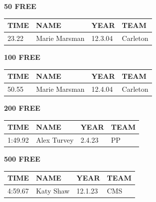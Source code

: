 \begin{table}[H]
\centering
\begin{minipage}[t]{0.48\textwidth}
\centering
\textbf{50 FREE}\\[0.1cm]
\begin{tabular}{@{}p{1.8cm}p{2.8cm}p{1.2cm}p{1.4cm}@{}}
\hline
    \textbf{TIME} & \textbf{NAME} & \textbf{YEAR} & \textbf{TEAM} \\
\hline
    23.22 & Marie Marsman & 12.3.04 & Carleton \\
\hline
\end{tabular}
\end{minipage}\hfill
\begin{minipage}[t]{0.48\textwidth}
\centering
\textbf{100 FREE}\\[0.1cm]
\begin{tabular}{@{}p{1.8cm}p{2.8cm}p{1.2cm}p{1.4cm}@{}}
\hline
    \textbf{TIME} & \textbf{NAME} & \textbf{YEAR} & \textbf{TEAM} \\
\hline
    50.55 & Marie Marsman & 12.4.04 & Carleton \\
\hline
\end{tabular}
\end{minipage}
\end{table}

\begin{table}[H]
\centering
\begin{minipage}[t]{0.48\textwidth}
\centering
\textbf{200 FREE}\\[0.1cm]
\begin{tabular}{@{}p{1.8cm}p{2.8cm}p{1.2cm}p{1.4cm}@{}}
\hline
    \textbf{TIME} & \textbf{NAME} & \textbf{YEAR} & \textbf{TEAM} \\
\hline
    1:49.92 & Alex Turvey & 2.4.23 & PP \\
\hline
\end{tabular}
\end{minipage}\hfill
\begin{minipage}[t]{0.48\textwidth}
\centering
\textbf{500 FREE}\\[0.1cm]
\begin{tabular}{@{}p{1.8cm}p{2.8cm}p{1.2cm}p{1.4cm}@{}}
\hline
    \textbf{TIME} & \textbf{NAME} & \textbf{YEAR} & \textbf{TEAM} \\
\hline
    4:59.67 & Katy Shaw & 12.1.23 & CMS \\
\hline
\end{tabular}
\end{minipage}
\end{table}

